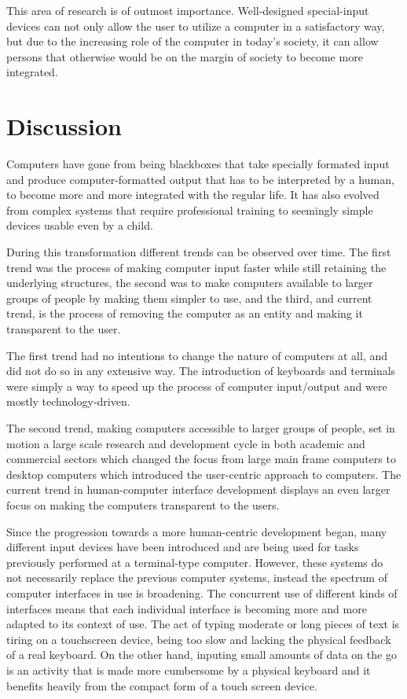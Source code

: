 This area of research is of outmost importance. Well-designed special-input devices can not only allow the user to utilize a computer in a satisfactory way, but due to the increasing role of the computer in today's society, it can allow persons that otherwise would be on the margin of society to become more integrated.

\section{Discussion}


Computers have gone from being blackboxes that take specially formated input and produce computer-formatted output that has to be interpreted by a human, to become more and more integrated with the regular life. It has also evolved from complex systems that require professional training to seemingly simple devices usable even by a child.

During this transformation different trends can be observed over time. The first trend was the process of making computer input faster while still retaining the underlying structures, the second was to make computers available to larger groups of people by making them simpler to use, and the third, and current trend, is the process of removing the computer as an entity and making it transparent to the user.

The first trend had no intentions to change the nature of computers at all, and did not do so in any extensive way. The introduction of keyboards and terminals were simply a way to speed up the process of computer input/output and were mostly technology-driven. 

The second trend, making computers accessible to larger groups of people, set in motion a large scale research and development cycle in both academic and commercial sectors which changed the focus from large main frame computers to desktop computers which introduced the user-centric approach to computers. The current trend in human-computer interface development displays an even larger focus on making the computers transparent to the users.

Since the progression towards a more human-centric development began, many different input devices have been introduced and are being used for tasks previously performed at a terminal-type computer. However, these systems do not necessarily replace the previous computer systems, instead the spectrum of computer interfaces in use is broadening. The concurrent use of different kinds of interfaces means that each individual interface is becoming more and more adapted to its context of use. The act of typing moderate or long pieces of text is tiring on a touchscreen device, being too slow and lacking the physical feedback of a real keyboard. On the other hand, inputing small amounts of data on the go is an activity that is made more cumbersome by a physical keyboard and it benefits heavily from the compact form of a touch screen device.

